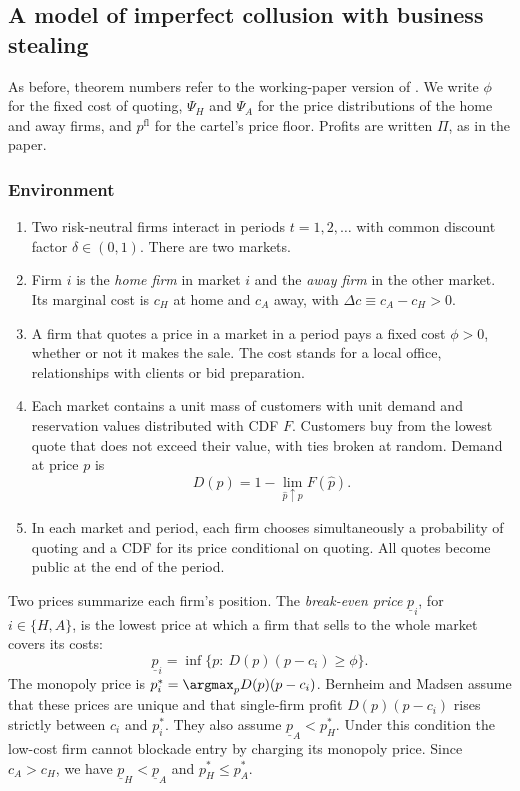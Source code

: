 \subsection{A model of imperfect collusion with business stealing}\label{sec:13-bm}

As before, theorem numbers refer to the working-paper version of \citet{BernheimMadsen2017}. We write $\phi$
for the fixed cost of quoting, $\Psi_H$ and $\Psi_A$ for the price distributions of the home and away firms,
and $p^{\mathrm{fl}}$ for the cartel's price floor. Profits are written $\Pi$, as in the paper.

\subsubsection{Environment}

\begin{assumption}[Environment]\label{asm:13-bm}
\leavevmode
\begin{enumerate}[label=(\roman*)]
\item Two risk-neutral firms interact in periods $t=1,2,\dots$ with common discount factor $\delta\in(0,1)$.
There are two markets.
\item Firm $i$ is the \emph{home firm} in market $i$ and the \emph{away firm} in the other market. Its marginal
cost is $c_H$ at home and $c_A$ away, with $\Delta c\equiv c_A-c_H>0$.
\item A firm that quotes a price in a market in a period pays a fixed cost $\phi>0$, whether or not it makes the
sale. The cost stands for a local office, relationships with clients or bid preparation.
\item Each market contains a unit mass of customers with unit demand and reservation values distributed with
CDF $F$. Customers buy from the lowest quote that does not exceed their value, with ties broken at random.
Demand at price $p$ is
\begin{equation}\label{eq:13-bm-demand}
D(p)=1-\lim_{\hat p\uparrow p}F(\hat p).
\end{equation}
\item In each market and period, each firm chooses simultaneously a probability of quoting and a CDF for its
price conditional on quoting. All quotes become public at the end of the period.
\end{enumerate}
\end{assumption}

Two prices summarize each firm's position. The \emph{break-even price} $\underline p_i$, for $i\in\{H,A\}$, is
the lowest price at which a firm that sells to the whole market covers its costs:
\begin{equation}\label{eq:13-bm-breakeven}
\underline p_i=\inf\bigl\{p:\ D(p)(p-c_i)\ge\phi\bigr\}.
\end{equation}
The monopoly price is $p_i^*=\argmax_p D(p)(p-c_i)$. Bernheim and Madsen assume that these prices are unique
and that single-firm profit $D(p)(p-c_i)$ rises strictly between $c_i$ and $p_i^*$. They also assume
$\underline p_A<p_H^*$. Under this condition the low-cost firm cannot blockade entry by charging its monopoly
price. Since $c_A>c_H$, we have $\underline p_H<\underline p_A$ and $p_H^*\le p_A^*$.

